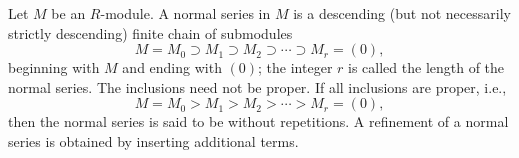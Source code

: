 Let $M$ be an $R$-module. A normal series in $M$ is a descending (but not necessarily strictly descending) finite chain of submodules
$$M = M_0 \supset M_1 \supset M_2 \supset \cdots \supset M_r = (0),$$
beginning with $M$ and ending with $(0)$; the integer $r$ is called the length of the normal series. The inclusions need not be proper. If all inclusions are proper, i.e.,
$$M = M_0 > M_1 > M_2 > \cdots > M_r = (0),$$
then the normal series is said to be without repetitions. A refinement of a normal series is obtained by inserting additional terms.
